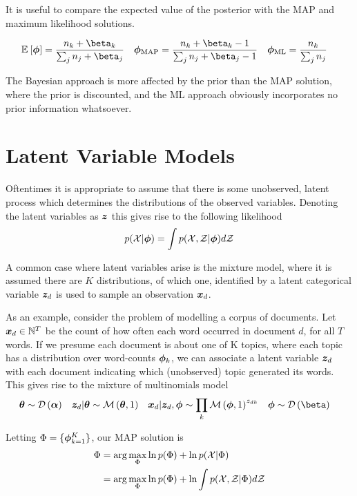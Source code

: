 It is useful to compare the expected value of the posterior with the MAP and maximum likelihood solutions.

\begin{align}
\ex{\param}{}  &= \frac{n_k + \beta_k}{\sum_j n_j + \beta_j} &
\map{\param} &= \frac{n_k + \beta_k - 1}{\sum_j n_j + \beta_j - 1} &
\ml{\param}  &= \frac{n_k}{\sum_j n_j}
\end{align}

The Bayesian approach is more affected by the prior than the MAP solution, where the prior is discounted, and the ML approach obviously incorporates no prior information whatsoever.
 
\section{Latent Variable Models}
Oftentimes it is appropriate to assume that there is some unobserved, latent process which determines the distributions of the observed variables. Denoting the latent variables as $\bm z$ this gives rise to the following likelihood
\begin{align}
p({ \mathcal{X} }|{ \bm \phi }) = \int p({ \mathcal{X} }, { \mathcal{Z} }|{ \bm \phi }) d{ \mathcal{Z} }
\end{align}

A common case where latent variables arise is the mixture model, where it is assumed there are $K$ distributions, of which one, identified by a latent categorical variable $\bm z_d$ is used to sample an observation ${ \bm x_d }$. 

As an example, consider the problem of modelling a corpus of documents. Let ${ \bm x_d } \in \mathbb{N}^T$ be the count of how often each word occurred in document $d$, for all $T$ words. If we presume each document is about one of K topics, where each topic has a distribution over word-counts $\bm \phi_k$, we can associate a latent variable $\bm z_d$ with each document indicating which (unobserved) topic generated its words. This gives rise to the mixture of multinomials model\cite{Nigam2000}
\begin{align}
\vv{\theta} & \sim \dir{\vv{\alpha}} &
\vv{z}_d|\vv{\theta} & \sim \muln{\vv{\theta}}{1} & 
\vv{x}_d|\vv{z}_d, \param & \sim \prod_k \muln{\param}{1}^{z_{dk}} & 
\param & \sim \dir{\vv{\beta}}
\end{align}

Letting ${ \Phi } = \{ \bm \phi_{k=1}^K \}$, our MAP solution is
\begin{align}
\begin{split}
{ \Phi } 
    &= \arg \max_{ \Phi } \ln p({ \Phi }) + \ln p({ \mathcal{X} }|{ \Phi }) \\
    &= \arg \max_{ \Phi } \ln p({ \Phi }) + \ln \int { p( { \mathcal{X} } ,  { \mathcal{Z} } |  { \Phi } ) } d{ \mathcal{Z} }
\end{split}
\end{align}



